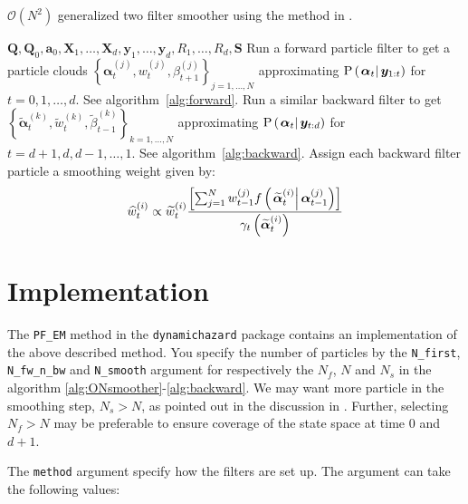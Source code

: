 \documentclass[9pt, notitlepage]{article}
\newcommand\StateXX{\Statex\hspace{\algorithmicindent}\hspace{\algorithmicindent}}
\renewcommand{\vec}[1]{\bm{#1}}
\newcommand{\mat}[1]{\mathbf{#1}}
\newcommand{\Lbrac}[1]{\left[ #1\right]}
\newcommand{\Lbrace}[1]{\left\{ #1\right\}}
\newcommand{\Lparen}[1]{\left( #1\right)}
\newcommand{\Cond}[2]{\left. #1 \vphantom{#2} \right\vert  #2}
\newcommand{\Prob}{\text{P}}
\newcommand{\optor}[2]{#1\Lparen{#2}}
\newcommand{\optorC}[3]{\optor{#1}{\Cond{#2}{#3}}}
\newcommand{\propC}[2]{\optorC{\Prob}{#1}{#2}}
\newcommand{\partic}[3]{#1_{#2}^{\Lparen{#3}}}
\newcommand{\particB}[3]{\widetilde{#1}_{#2}^{\Lparen{#3}}}
\newcommand{\particS}[3]{\widehat{#1}_{#2}^{\Lparen{#3}}}
\newcommand{\bigO}[1]{\mathcal{O}\Lparen{#1}}
\newcommand{\nPart}{N}
\newcommand{\nPeriods}{d}
\begin{document}
\begin{algorithm}[H]
\caption{$\bigO{\nPart^2}$ generalized two filter smoother using the method in \citet{briers10}.}\label{alg:ON2smoother}
\begin{algorithmic}[1]\raggedright
\INPUT
\Statex $\mat{Q},\mat{Q}_0,\vec{a}_0,\mat{X}_1,\dots,\mat{X}_d,\vec{y}_1,\dots,\vec{y}_d,R_1,\dots,R_d,\mat{S}$
%
\State Run a forward particle filter to get a particle clouds %
	$\Lbrace{\partic{\vec{\alpha}}{t}{j}, \partic{w}{t}{j}, \partic{\beta}{t + 1}{j}}_{j=1,\dots,N}$ %
	approximating $\propC{\vec{\alpha}_t}{\vec{y}_{1:t}}$ for $t = 0, 1, \dots, \nPeriods$. See algorithm~\ref{alg:forward}.
\EndProcedure
%
\State Run a similar backward filter to get %
	$\Lbrace{\particB{\vec{\alpha}}{t}{k}, \particB{w}{t}{k}, \particB{\beta}{t - 1}{k}}_{k=1,\dots,N}$  %
	approximating $\propC{\vec{\alpha}_t}{\vec{y}_{t:\nPeriods}}$ for $t = \nPeriods + 1, \nPeriods, \nPeriods-1, \dots, 1$. See algorithm~\ref{alg:backward}.
\EndProcedure
%
\For{$t=1,\dots, \nPeriods$}
\State Assign each backward filter particle a smoothing weight given by:
\StateXX \begin{equation}\label{eqn:combineWeightO2}
\particS{w}{t}{i} \propto
	\particB{w}{t}{i} \frac{\Lbrac{
		\sum_{j = 1}^\nPart \partic{w}{t - 1}{j}
		\optorC{f}{\particB{\vec{\alpha}}{t}{i}}{\partic{\vec{\alpha}}{t - 1}{j}}
	}}{ \optor{\gamma_t}{\particB{\vec{\alpha}}{t}{i}}}
\end{equation}
\EndFor
\EndProcedure
\end{algorithmic}
\end{algorithm}


\section{Implementation}
The \verb|PF_EM| method in the \verb|dynamichazard| package contains an implementation of the above described method. You specify the number of particles by the \verb|N_first|, \verb|N_fw_n_bw| and \verb|N_smooth| argument for respectively the $\nPart_f$, $\nPart$ and $\nPart_s$ in the algorithm \ref{alg:ONsmoother}-\ref{alg:backward}. We may want more particle in the smoothing step, $\nPart_s > \nPart$, as pointed out in the discussion in \citet[page 460 and 461]{fearnhead10}. Further, selecting $\nPart_f > \nPart$ may be preferable to ensure coverage of the state space at time $0$ and $\nPeriods + 1$.

The \verb|method| argument specify how the filters are set up. The argument can take the following values:
\end{document}
